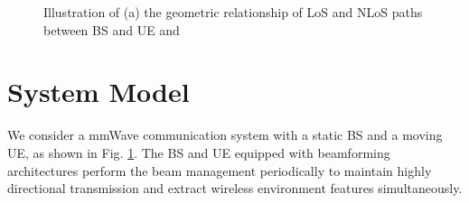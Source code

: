 \documentclass[journal,12pt,onecolumn,draftclsnofoot,]{IEEEtran}
\begin{document}
\begin{figure}[]
\centering
{}
\quad
{}
\caption{Illustration of 
(a) the geometric relationship of LoS and NLoS paths between BS and UE and
{\color{black}{(b) the change of the LoS path and the $l$-th NLoS path between time $t-1$ and $t$ with the static VA.}}}
\label{a}%
\vspace{-8mm}
\end{figure}
\vspace{-3.5mm}
\section{System Model}
We consider a mmWave communication system with a static BS and a moving UE, as shown in Fig. \ref{a}. The BS and UE equipped with beamforming architectures perform the beam management periodically to maintain highly directional transmission and extract wireless environment features simultaneously.
\vspace{-3.5mm}
\end{document}

